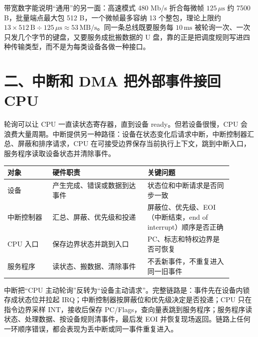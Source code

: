带宽数字能说明“通用”的另一面：高速模式 480 Mb/s 折合每微帧 $125\,\mu\text{s}$ 约 7500 B，批量端点最大包 512 B，一个微帧最多容纳 13 个整包，理论上限约 $13\times512\,\text{B}\div125\,\mu\text{s}\approx53\,\text{MB/s}$。同一条总线既要服务每 $10\,\text{ms}$ 被轮询一次、一次只发几个字节的键盘，又要服务成批搬数据的 U 盘，靠的正是把调度规则写进四种传输类型，而不是为每类设备各做一种接口。

\section{二、中断和 DMA 把外部事件接回 CPU}

轮询可以让 CPU 一直读状态寄存器，直到设备 ready。但若设备很慢，CPU 会浪费大量周期。中断提供另一种路径：设备在状态变化后请求中断，中断控制器汇总、屏蔽和排序请求，CPU 在可接受边界保存当前执行上下文，跳到中断入口，服务程序读取设备状态并清除事件。

\begin{longtable}{L{0.18\linewidth}L{0.38\linewidth}L{0.34\linewidth}}
\toprule
对象 & 硬件职责 & 关键问题 \\
\midrule
设备 & 产生完成、错误或数据到达事件 & 状态位和中断请求是否同步一致 \\\tablerowrule
中断控制器 & 汇总、屏蔽、优先级和投递 & 屏蔽位、优先级、EOI（中断结束，end of interrupt）顺序是否正确 \\\tablerowrule
CPU 入口 & 保存边界状态并跳到入口 & PC、标志和特权边界是否可恢复 \\\tablerowrule
服务程序 & 读状态、搬数据、清除事件 & 不丢新事件，不重复进入同一旧事件 \\
\bottomrule
\end{longtable}

中断把“CPU 主动轮询”反转为“设备主动请求”。完整链路是：事件先在设备内锁存成状态位并拉起 IRQ；中断控制器按屏蔽位和优先级决定是否投递；CPU 只在指令边界采样 INT，接收后保存 PC/Flags，查向量表跳到服务程序；服务程序读状态、处理数据、按设备规则清事件，最后发 EOI 并恢复现场返回。链路上任何一环顺序错误，都会表现为丢中断或同一事件重复进入。

